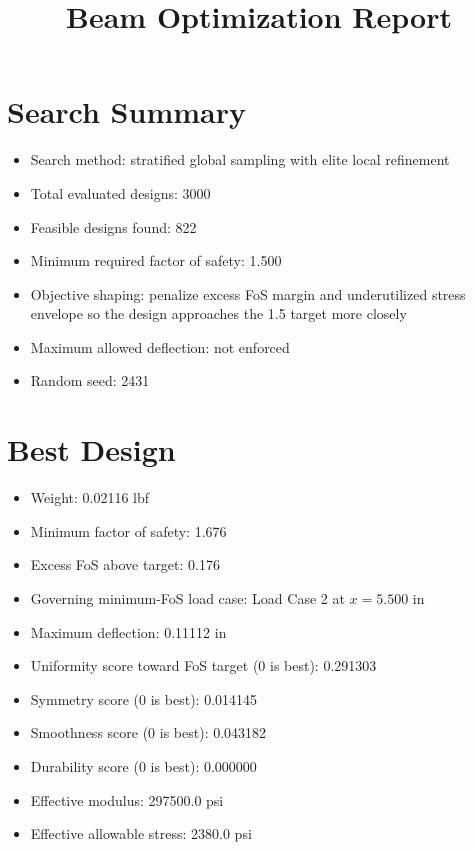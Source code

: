 \documentclass[11pt]{article}
\title{Beam Optimization Report}
\date{}
\begin{document}
\maketitle

\section*{Search Summary}
\begin{itemize}
\item Search method: stratified global sampling with elite local refinement
\item Total evaluated designs: 3000
\item Feasible designs found: 822
\item Minimum required factor of safety: 1.500
\item Objective shaping: penalize excess FoS margin and underutilized stress envelope so the design approaches the 1.5 target more closely
\item Maximum allowed deflection: not enforced
\item Random seed: 2431
\end{itemize}

\section*{Best Design}
\begin{itemize}
\item Weight: 0.02116 lbf
\item Minimum factor of safety: 1.676
\item Excess FoS above target: 0.176
\item Governing minimum-FoS load case: Load Case 2 at $x=5.500$ in
\item Maximum deflection: 0.11112 in
\item Uniformity score toward FoS target (0 is best): 0.291303
\item Symmetry score (0 is best): 0.014145
\item Smoothness score (0 is best): 0.043182
\item Durability score (0 is best): 0.000000
\item Effective modulus: 297500.0 psi
\item Effective allowable stress: 2380.0 psi
\end{itemize}
\end{document}

